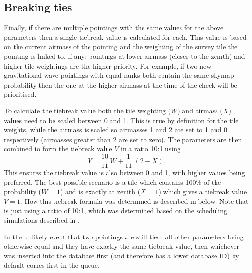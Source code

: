 \begin{colsection}
\begin{colsection}
\end{colsection}

\subsection{Breaking ties}
\label{sec:breaking_ties}
\begin{colsection}

Finally, if there are multiple pointings with the same values for the above parameters then a single tiebreak value is calculated for each. This value is based on the current airmass of the pointing and the weighting of the survey tile the pointing is linked to, if any; pointings at lower airmass (closer to the zenith) and higher tile weightings are the higher priority. For example, if two new gravitational-wave pointings with equal ranks both contain the same skymap probability then the one at the higher airmass at the time of the check will be prioritised.

To calculate the tiebreak value both the tile weighting ($W$) and airmass ($X$) values need to be scaled between 0 and 1. This is true by definition for the tile weights, while the airmass is scaled so airmasses 1 and 2 are set to 1 and 0 respectively (airmasses greater than 2 are set to zero). The parameters are then combined to form the tiebreak value $V$ in a ratio 10:1 using
%
\begin{equation}
    V = \frac{10}{11}~W + \frac{1}{11}~(2 - X).
    \label{eq:tiebreak}
\end{equation}
%
This ensures the tiebreak value is also between 0 and 1, with higher values being preferred. The best possible scenario is a tile which contains 100\% of the probability ($W=1$) and is exactly at zenith ($X=1$) which gives a tiebreak value $V=1$. How this tiebreak formula was determined is described in  below. Note that  is just  using a ratio of 10:1, which was determined based on the scheduling simulations described in .

In the unlikely event that two pointings are still tied, all other parameters being otherwise equal and they have exactly the same tiebreak value, then whichever was inserted into the database first (and therefore has a lower database ID) by default comes first in the queue.

\end{colsection}


\end{colsection}
